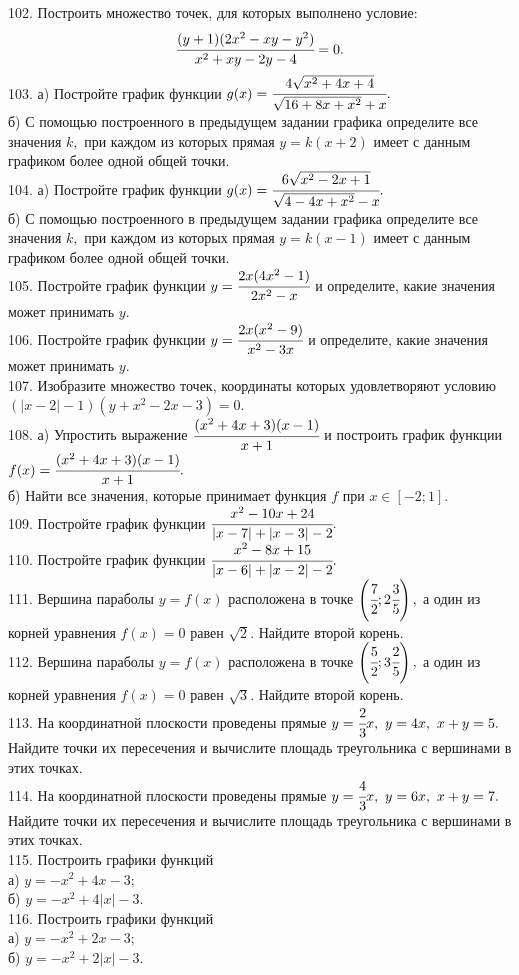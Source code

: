 \documentclass[12pt]{article}
\begin{document}
102. Построить множество точек, для которых выполнено условие:
$$\cfrac{(y+1)(2x^2-xy-y^2)}{x^2+xy-2y-4}=0.$$
103. а) Постройте график функции $g(x)=\cfrac{4\sqrt{x^2+4x+4}}{\sqrt{16+8x+x^2}+x}.$\\
б) С помощью построенного в предыдущем задании графика определите все значения $k,$ при каждом из которых прямая $y=k(x+2)$ имеет с данным графиком более одной общей точки.\\
104. а) Постройте график функции $g(x)=\cfrac{6\sqrt{x^2-2x+1}}{\sqrt{4-4x+x^2}-x}.$\\
б) С помощью построенного в предыдущем задании графика определите все значения $k,$ при каждом из которых прямая $y=k(x-1)$ имеет с данным графиком более одной общей точки.\\
105. Постройте график функции $y=\cfrac{2x(4x^2-1)}{2x^2-x}$ и определите, какие значения может принимать $y.$\\
106. Постройте график функции $y=\cfrac{2x(x^2-9)}{x^2-3x}$ и определите, какие значения может принимать $y.$\\
107. Изобразите множество точек, координаты которых удовлетворяют условию $(|x-2|-1)(y+x^2-2x-3)=0.$\\
108. а) Упростить выражение $\cfrac{(x^2+4x+3)(x-1)}{x+1}$ и построить график функции \\$f(x)=\cfrac{(x^2+4x+3)(x-1)}{x+1}.$\\
б) Найти все значения, которые принимает функция $f$ при $x\in[-2;1].$\\
109. Постройте график функции $\cfrac{x^2-10x+24}{|x-7|+|x-3|-2}.$\\
110. Постройте график функции $\cfrac{x^2-8x+15}{|x-6|+|x-2|-2}.$\\
111. Вершина параболы $y=f(x)$ расположена в точке $\left(\cfrac{7}{2};2\cfrac{3}{5}\right),$ а один из корней уравнения $f(x)=0$
равен $\sqrt{2}.$ Найдите второй корень.\\
112. Вершина параболы $y=f(x)$ расположена в точке $\left(\cfrac{5}{2};3\cfrac{2}{5}\right),$ а один из корней уравнения $f(x)=0$
равен $\sqrt{3}.$ Найдите второй корень.\\
113. На координатной плоскости проведены прямые $y=\cfrac{2}{3}x,\ y=4x,\ x+y=5.$ Найдите точки их пересечения и вычислите площадь треугольника
с вершинами в этих точках.\\
114. На координатной плоскости проведены прямые $y=\cfrac{4}{3}x,\ y=6x,\ x+y=7.$ Найдите точки их пересечения и вычислите площадь треугольника
с вершинами в этих точках.\\
115. Построить графики функций\\
а) $y=-x^2+4x-3;$\\
б) $y=-x^2+4|x|-3.$\\
116. Построить графики функций\\
а) $y=-x^2+2x-3;$\\
б) $y=-x^2+2|x|-3.$
\newpage
\end{document}
